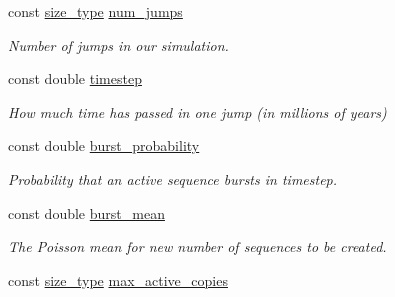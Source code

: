 \begin{DoxyCompactItemize}
\item 
\mbox{\label{classretrocombinator_1_1Evolution_a043c016f93a961d0e3a2fc9d257b01d9}} 
const \hyperlink{namespaceretrocombinator_a8e1541b50cee66a791df4c437ccbb385}{size\+\_\+type} \hyperlink{classretrocombinator_1_1Evolution_a043c016f93a961d0e3a2fc9d257b01d9}{num\+\_\+jumps}
\begin{DoxyCompactList}\small\item\em Number of jumps in our simulation. \end{DoxyCompactList}\item 
\mbox{\label{classretrocombinator_1_1Evolution_afdb375b975d48d9915c6e8337c33a175}} 
const double \hyperlink{classretrocombinator_1_1Evolution_afdb375b975d48d9915c6e8337c33a175}{timestep}
\begin{DoxyCompactList}\small\item\em How much time has passed in one jump (in millions of years) \end{DoxyCompactList}\item 
\mbox{\label{classretrocombinator_1_1Evolution_afb663b25070c1ca619e682cef2a32196}} 
const double \hyperlink{classretrocombinator_1_1Evolution_afb663b25070c1ca619e682cef2a32196}{burst\+\_\+probability}
\begin{DoxyCompactList}\small\item\em Probability that an active sequence bursts in {\itshape timestep}. \end{DoxyCompactList}\item 
\mbox{\label{classretrocombinator_1_1Evolution_ac2f4821269c08b23f21b5333f2067e5f}} 
const double \hyperlink{classretrocombinator_1_1Evolution_ac2f4821269c08b23f21b5333f2067e5f}{burst\+\_\+mean}
\begin{DoxyCompactList}\small\item\em The Poisson mean for new number of sequences to be created. \end{DoxyCompactList}\item 
\mbox{\label{classretrocombinator_1_1Evolution_a0e6b2c75bdc36f8f482162f2f8c67d56}} 
const \hyperlink{namespaceretrocombinator_a8e1541b50cee66a791df4c437ccbb385}{size\+\_\+type} \hyperlink{classretrocombinator_1_1Evolution_a0e6b2c75bdc36f8f482162f2f8c67d56}{max\+\_\+active\+\_\+copies}

\end{DoxyCompactItemize}
